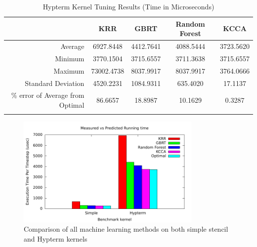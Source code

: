 \begin{table}[h]
\caption{Hypterm Kernel Tuning Results (Time in Microseconds)}
\center
\begin{tabular}{r c c c c}
\hline
 & KRR	& GBRT	& Random Forest	& KCCA \\
\hline\hline
Average	& 6927.8448	& 4412.7641	& 4088.5444	& 3723.5620 \\
Minimum	& 3770.1504	& 3715.6557	& 3711.3638	& 3715.6557 \\
Maximum	& 73002.4738	& 8037.9917	& 8037.9917	& 3764.0666 \\
Standard Deviation	& 4520.2231	& 1084.9311	& 635.4020	& 17.1137 \\
\% error of Average from Optimal	& 86.6657	& 18.8987	& 10.1629	& 0.3287 \\
\hline
\label{tbl:hypterm}
\end{tabular}
\label{table:simple}
\end{table}

\begin{figure}[h]
\centering
\includegraphics[width=0.8\textwidth]{./images/compare_all.pdf}
\caption{Comparison of all machine learning methods on both simple stencil and Hypterm kernels}
\label{fig:compare_all}
\end{figure}
